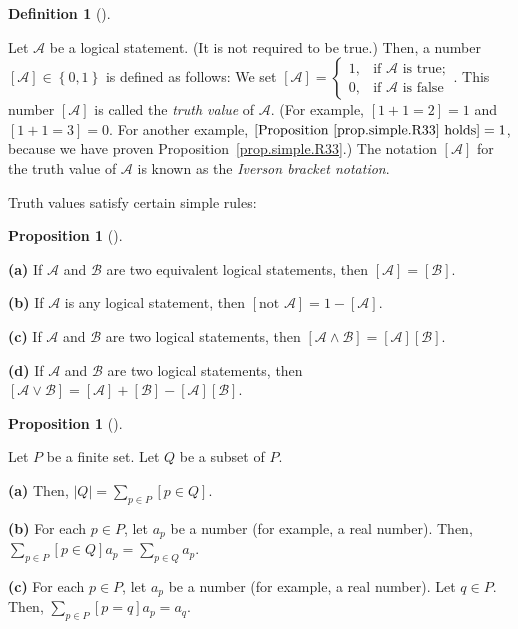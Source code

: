\documentclass[numbers=enddot,12pt,final,onecolumn,notitlepage]{scrartcl}%
\theoremstyle{definition}
\newtheorem{prop}[theo]{Proposition}
\newenvironment{proposition}[1][]
{\begin{prop}[#1]\begin{leftbar}}
{\end{leftbar}\end{prop}}
\newtheorem{defi}[theo]{Definition}
\newenvironment{definition}[1][]
{\begin{defi}[#1]\begin{leftbar}}
{\end{leftbar}\end{defi}}
\let\sumnonlimits\sum
\renewcommand{\sum}{\sumnonlimits\limits}
\newcommand{\set}[1]{\left\{ #1 \right\}}
\newcommand{\abs}[1]{\left| #1 \right|}
\newcommand{\ive}[1]{\left[ #1 \right]}
\begin{document}
\begin{definition} \label{def.intro.iverson}
Let $\mathcal{A}$ be a logical statement. (It is not required to be
true.) Then, a number
$\ive{\mathcal{A}} \in \set{0, 1}$ is defined as follows:
We set $\ive{\mathcal{A}} =
\begin{cases}
1, & \text{if }\mathcal{A}\text{ is true};\\
0, & \text{if }\mathcal{A}\text{ is false}
\end{cases}$.
This number $\ive{\mathcal{A}}$ is called the \textit{truth value}
of $\mathcal{A}$.
(For example, $\ive{1+1 = 2} = 1$ and $\ive{1+1 = 3} = 0$. For
another example,
$\ive{\text{Proposition~\ref{prop.simple.R33} holds}}
= 1$, because we have proven Proposition~\ref{prop.simple.R33}.)
The notation $\ive{\mathcal{A}}$ for the truth value of $\mathcal{A}$
is known as the \textit{Iverson bracket notation}.
\end{definition}

Truth values satisfy certain simple rules:

\begin{proposition} \label{prop.intro.iverson.rules}
\textbf{(a)} If $\mathcal{A}$ and $\mathcal{B}$ are two equivalent
logical statements, then
$\ive{\mathcal{A}} = \ive{\mathcal{B}}$.

\textbf{(b)} If $\mathcal{A}$ is any logical statement, then
$\ive{\text{not } \mathcal{A}} = 1 - \ive{\mathcal{A}}$.

\textbf{(c)} If $\mathcal{A}$ and $\mathcal{B}$ are two logical
statements, then
$\ive{\mathcal{A} \wedge \mathcal{B}}
= \ive{\mathcal{A}} \ive{\mathcal{B}}$.

\textbf{(d)} If $\mathcal{A}$ and $\mathcal{B}$ are two logical
statements, then
$\ive{\mathcal{A} \vee \mathcal{B}}
= \ive{\mathcal{A}} + \ive{\mathcal{B}}
  - \ive{\mathcal{A}} \ive{\mathcal{B}}$.
\end{proposition}

\begin{proposition} \label{prop.intro.iverson.sums}
Let $P$ be a finite set. Let $Q$ be a subset of $P$.

\textbf{(a)} Then, $\abs{Q} = \sum_{p \in P} \ive{p \in Q}$.

\textbf{(b)} For each $p \in P$, let $a_p$ be a number (for example,
a real number). Then, $\sum_{p \in P} \ive{p \in Q} a_p
= \sum_{p \in Q} a_p$.

\textbf{(c)} For each $p \in P$, let $a_p$ be a number (for example,
a real number). Let $q \in P$. Then,
$\sum_{p \in P} \ive{p = q} a_p = a_q$.
\end{proposition}
\end{document}

